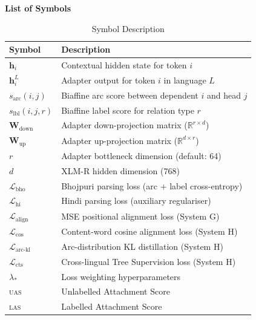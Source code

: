 \documentclass[12pt,a4paper,oneside]{report}
\newcommand{\uas}{\textsc{uas}}
\newcommand{\las}{\textsc{las}}
\begin{document}
\newpage
\tableofcontents

\newpage
\listoffigures

\newpage
\listoftables

\newpage
\thispagestyle{plain}
\begin{center}
{\Large \textbf{List of Symbols}}
\end{center}
\vspace{0.5cm}

\begin{table}[ht]
\centering
\caption{Symbol Description}
\label{tab:symbols}
\begin{tabular}{@{}lp{10cm}@{}}
\toprule
\textbf{Symbol} & \textbf{Description} \\
\midrule
$\mathbf{h}_i$            & Contextual hidden state for token $i$ \\
$\mathbf{h}^L_i$          & Adapter output for token $i$ in language $L$ \\
$s_{\text{arc}}(i,j)$     & Biaffine arc score between dependent $i$ and head $j$ \\
$s_{\text{lbl}}(i,j,r)$   & Biaffine label score for relation type $r$ \\
$\mathbf{W}_{\text{down}}$& Adapter down-projection matrix ($\mathbb{R}^{r \times d}$) \\
$\mathbf{W}_{\text{up}}$  & Adapter up-projection matrix ($\mathbb{R}^{d \times r}$) \\
$r$                        & Adapter bottleneck dimension (default: 64) \\
$d$                        & XLM-R hidden dimension (768) \\
$\mathcal{L}_{\text{bho}}$& Bhojpuri parsing loss (arc + label cross-entropy) \\
$\mathcal{L}_{\text{hi}}$ & Hindi parsing loss (auxiliary regulariser) \\
$\mathcal{L}_{\text{align}}$ & MSE positional alignment loss (System G) \\
$\mathcal{L}_{\text{cos}}$   & Content-word cosine alignment loss (System H) \\
$\mathcal{L}_{\text{arc-kl}}$& Arc-distribution KL distillation (System H) \\
$\mathcal{L}_{\text{cts}}$   & Cross-lingual Tree Supervision loss (System H) \\
$\lambda_*$                   & Loss weighting hyperparameters \\
\uas{}                         & Unlabelled Attachment Score \\
\las{}                         & Labelled Attachment Score \\
\bottomrule
\end{tabular}
\end{table}
\end{document}
